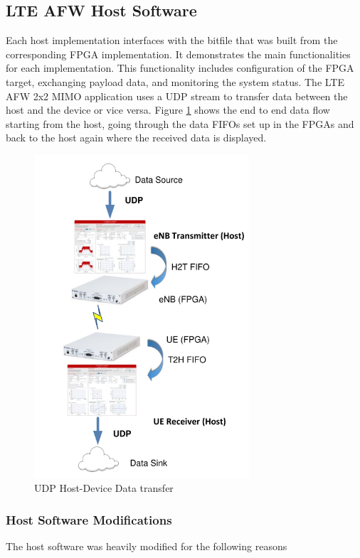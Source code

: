 \subsection{LTE AFW Host Software}\label{ssec:LTEAFWHostSW}
Each host implementation interfaces with the bitfile that was built from the corresponding FPGA implementation. It demonstrates the main functionalities for each implementation. This functionality includes configuration of the FPGA target, exchanging payload data, and monitoring the system status. The LTE AFW 2x2 MIMO application uses a UDP stream to transfer data between the host and the device or vice versa. Figure \ref{fig:UDPDataTransfer} shows the end to end data flow starting from the host, going through the data FIFOs set up in the FPGAs and back to the host again where the received data is displayed.
\begin{figure}[H]
    \centering
    \includegraphics[width=8cm]{images/UDPDataTransfer.png}
    \caption{UDP Host-Device Data transfer}
    \label{fig:UDPDataTransfer}
\end{figure}

\subsubsection{Host Software Modifications}\label{ssec:LTEAFWHostSWMods}
The host software was heavily modified for the following reasons

